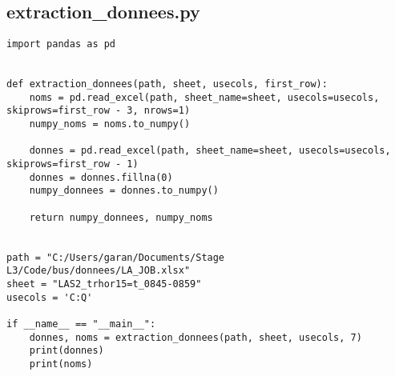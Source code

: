 \documentclass[12pt]{article}
\begin{document}
\subsection{extraction\_donnees.py}
\label{extraction_donnees.py}
\begin{lstlisting}
import pandas as pd


def extraction_donnees(path, sheet, usecols, first_row):
    noms = pd.read_excel(path, sheet_name=sheet, usecols=usecols, skiprows=first_row - 3, nrows=1)
    numpy_noms = noms.to_numpy()

    donnes = pd.read_excel(path, sheet_name=sheet, usecols=usecols, skiprows=first_row - 1)
    donnes = donnes.fillna(0)
    numpy_donnees = donnes.to_numpy()

    return numpy_donnees, numpy_noms


path = "C:/Users/garan/Documents/Stage L3/Code/bus/donnees/LA_JOB.xlsx"
sheet = "LAS2_trhor15=t_0845-0859"
usecols = 'C:Q'

if __name__ == "__main__":
    donnes, noms = extraction_donnees(path, sheet, usecols, 7)
    print(donnes)
    print(noms)
\end{lstlisting}
\end{document}
